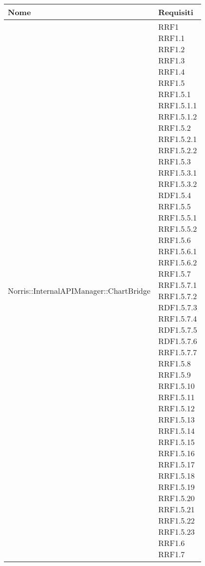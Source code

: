 
				\begin{longtabu} spread 1cm [c]{|X[0.8]|X[0.2]|}
					\hline
					\rowfont{\bf \centering}
					Nome &
					Requisiti \\
					\hline
					\endhead
					
					Norris::InternalAPIManager::ChartBridge & \parbox[t]{8cm}{ RRF1 \\ RRF1.1 \\ RRF1.2 \\ RRF1.3 \\ RRF1.4 \\ RRF1.5 \\ RRF1.5.1 \\ RRF1.5.1.1 \\ RRF1.5.1.2 \\ RRF1.5.2 \\ RRF1.5.2.1 \\ RRF1.5.2.2 \\ RRF1.5.3 \\ RRF1.5.3.1 \\ RRF1.5.3.2 \\ RDF1.5.4 \\ RRF1.5.5 \\ RRF1.5.5.1 \\ RRF1.5.5.2 \\ RRF1.5.6 \\ RRF1.5.6.1 \\ RRF1.5.6.2 \\ RRF1.5.7 \\ RRF1.5.7.1 \\ RRF1.5.7.2 \\ RDF1.5.7.3 \\ RRF1.5.7.4 \\ RDF1.5.7.5 \\ RDF1.5.7.6 \\ RRF1.5.7.7 \\ RRF1.5.8 \\ RRF1.5.9 \\ RRF1.5.10 \\ RRF1.5.11 \\ RRF1.5.12 \\ RRF1.5.13 \\ RRF1.5.14 \\ RRF1.5.15 \\ RRF1.5.16 \\ RRF1.5.17 \\ RRF1.5.18 \\ RRF1.5.19 \\ RRF1.5.20 \\ RRF1.5.21 \\ RRF1.5.22 \\ RRF1.5.23 \\ RRF1.6 \\ RRF1.7} \\ \hline

\end{longtabu}
